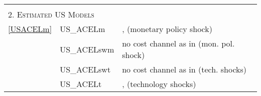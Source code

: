 \documentclass[11pt,a4paper]{article}
\begin{document}
	
	
	
	
	\vspace{-1cm}
	
	\begin{table}[H]
		\begin{tabularx}{\textwidth}{lll}
			\hline \hline
			&& \\
			\multicolumn{3}{l}{\textsc{2. Estimated US Models}} \\
			\ref{USACELm} & US\_ACELm & \cite{AltigChristianoEichenbaumLinde2005}, (monetary policy shock)  \\
			& US\_ACELswm & no cost channel as in \cite{TaylorWieland2011} (mon. pol. shock) \\
			& US\_ACELswt & no cost channel as in \cite{TaylorWieland2011} (tech. shocks) \\
			& US\_ACELt & \cite{AltigChristianoEichenbaumLinde2005}, (technology shocks) \\
			

\end{tabularx}
\end{table}
\end{document}
